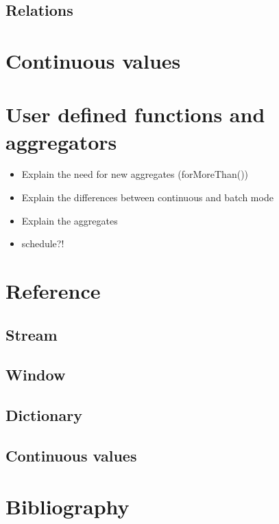 \documentclass{report}
\begin{document}

\section{Relations}

\chapter{Continuous values}

\chapter{User defined functions and aggregators}
\begin{itemize}
\item Explain the need for new aggregates (forMoreThan())
\item Explain the differences between continuous and batch mode
\item Explain the aggregates
\item schedule?!
\end{itemize}
\chapter{Reference}

\section{Stream}

\section{Window}

\section{Dictionary}

\section{Continuous values}

\chapter{Bibliography}
\end{document}
